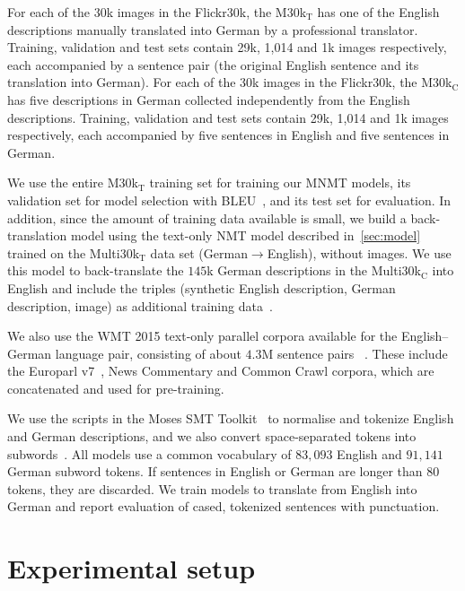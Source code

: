 \documentclass[11pt]{article}
\begin{document}
For each of the 30k images in the Flickr30k, the M30k$_\text{T}$ has one of the English descriptions manually translated into German by a professional translator. Training, validation and test sets contain 29k, 1,014 and 1k images respectively, each accompanied by a sentence pair (the original English sentence and its translation into German).
For each of the 30k images in the Flickr30k, the M30k$_\text{C}$ has five descriptions in German collected independently from the English descriptions. Training, validation and test sets contain 29k, 1,014 and 1k images respectively, each accompanied by five sentences in English and five sentences in German.

We use the entire M30k$_\text{T}$ training set for training our MNMT models, its validation set for model selection with BLEU~\cite{Papinenietal2002}, and its test set for evaluation.
In addition, since the amount of training data available is small, we build a back-translation model using the text-only NMT model described in~\cref{sec:model} trained on the Multi30k$_\text{T}$ data set (German$\rightarrow$English), without images.
We use this model to back-translate the $145$k German descriptions in the Multi30k$_\text{C}$ into English and include the triples (synthetic English description, German description, image) as additional training data~\cite{Sennrichetal2016a}.

We also use the WMT 2015 text-only parallel corpora available for the English--German language pair, consisting of about $4.3$M sentence pairs ~\cite{Bojaretal2015}.
These include the Europarl v7~\cite{Koehn2005}, News Commentary and Common Crawl corpora, which are concatenated and used for pre-training.

We use the scripts in the Moses SMT Toolkit~\cite{Koehnetal2007} to normalise and tokenize English and German descriptions, and we also convert space-separated tokens into subwords~\cite{Sennrichetal2016}.
All models use a common vocabulary of $83,093$ English and $91,141$ German subword tokens.
If sentences in English or German are longer than 80 tokens, they are discarded.
We train models to translate from English into German and report evaluation of cased, tokenized sentences with punctuation.


\section{Experimental setup}
\label{sec:experiments}
\end{document}
